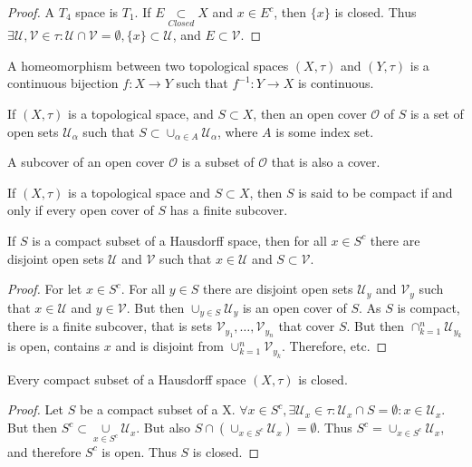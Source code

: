 \documentclass[crop=false,class=book]{standalone}
\begin{document}
\begin{proof}
A $T_4$ space is $T_1$. If $E\underset{Closed}\subset X$ and $x\in E^c$, then $\{x\}$ is closed. Thus $\exists \mathcal{U},\mathcal{V}\in\tau: \mathcal{U}\cap\mathcal{V}=\emptyset, \{x\}\subset \mathcal{U}$, and $E\subset \mathcal{V}$.
\end{proof}
\begin{definition}
A homeomorphism between two topological spaces $(X,\tau)$ and $(Y,\tau)$ is a continuous bijection $f:X\rightarrow Y$ such that $f^{-1}:Y\rightarrow X$ is continuous.
\end{definition}
\begin{definition}
If $(X,\tau)$ is a topological space, and $S\subset X$, then an open cover $\mathcal{O}$ of $S$ is a set of open sets $\mathcal{U}_{\alpha}$ such that $S\subset \cup_{\alpha\in A} \mathcal{U}_{\alpha}$, where $A$ is some index set.
\end{definition}
\begin{definition}
A subcover of an open cover $\mathcal{O}$ is a subset of $\mathcal{O}$ that is also a cover.
\end{definition}
\begin{definition}
If $(X,\tau)$ is a topological space and $S\subset X$, then $S$ is said to be compact if and only if every open cover of $S$ has a finite subcover.
\end{definition}
\begin{theorem}
If $S$ is a compact subset of a Hausdorff space, then for all $x\in S^c$ there are disjoint open sets $\mathcal{U}$ and $\mathcal{V}$ such that $x\in \mathcal{U}$ and $S\subset \mathcal{V}$.
\end{theorem}
\begin{proof}
For let $x\in S^c$. For all $y\in S$ there are disjoint open sets $\mathcal{U}_y$ and $\mathcal{V}_y$ such that $x\in \mathcal{U}$ and $y\in \mathcal{V}$. But then $\cup_{y\in S} \mathcal{U}_y$ is an open cover of $S$. As $S$ is compact, there is a finite subcover, that is sets $\mathcal{V}_{y_1},\hdots, \mathcal{V}_{y_n}$ that cover $S$. But then $\cap_{k=1}^{n} \mathcal{U}_{y_k}$ is open, contains $x$ and is disjoint from $\cup_{k=1}^{n} \mathcal{V}_{y_k}$. Therefore, etc.
\end{proof}
\begin{theorem}
Every compact subset of a Hausdorff space $(X,\tau)$ is closed.
\end{theorem}
\begin{proof}
Let $S$ be a compact subset of a X. $\forall x\in S^c, \exists \mathcal{U}_x\in \tau:\mathcal{U}_x\cap S = \emptyset:x\in \mathcal{U}_x$. But then $S^c \subset \underset{x\in S^c}\cup\mathcal{U}_x$. But also $S\cap (\cup_{x\in S^c}\mathcal{U}_x) = \emptyset$. Thus $S^c = \cup_{x\in S^c}\mathcal{U}_x$, and therefore $S^c$ is open. Thus $S$ is closed.
\end{proof}
\end{document}

